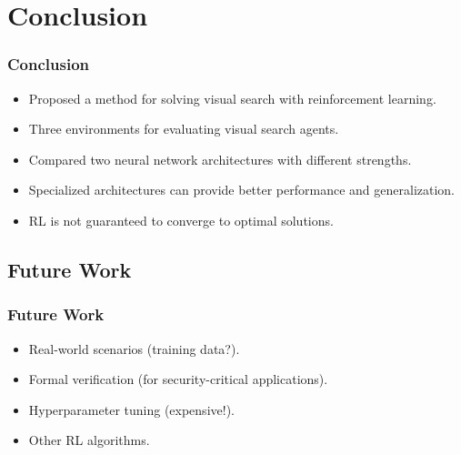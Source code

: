 \section{Conclusion}

\begin{frame}
    \frametitle{Conclusion}

    \begin{itemize}
        \item Proposed a method for solving visual search with reinforcement learning.
        \item Three environments for evaluating visual search agents.
        \item Compared two neural network architectures with different strengths.
        \item Specialized architectures can provide better performance and generalization.
        \item RL is not guaranteed to converge to optimal solutions.
    \end{itemize}
\end{frame}

\subsection{Future Work}

\begin{frame}
    \frametitle{Future Work}

    \begin{itemize}
        \item Real-world scenarios (training data?).
        \item Formal verification (for security-critical applications).
        \item Hyperparameter tuning (expensive!).
        \item Other RL algorithms.
    \end{itemize}
\end{frame}